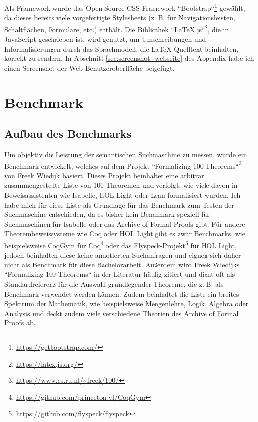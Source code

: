 \documentclass[12pt,letterpaper]{article} %
\begin{document}
Als Framework wurde das Open-Source-CSS-Framework ``Bootstrap``\footnote{\url{https://getbootstrap.com/}} gewählt, da dieses bereits viele vorgefertigte Stylesheets (z. B. für Navigationsleisten, Schaltflächen, Formulare, etc.) enthält.
Die Bibliothek ``LaTeX.js``\footnote{\url{https://latex.js.org/}}, die in JavaScript geschrieben ist, wird genutzt, um Umschreibungen und Informalisierungen durch das Sprachmodell, die LaTeX-Quelltext beinhalten, korrekt zu rendern.
In Abschnitt \ref{sec:screenshot_webseite} des Appendix habe ich einen Screenshot der Web-Benutzeroberfläche beigefügt.

\section{Benchmark}

\subsection{Aufbau des Benchmarks}
\label{sec:aufbau_des_benchmarks}

Um objektiv die Leistung der semantischen Suchmaschine zu messen, wurde ein Benchmark entwickelt, welches auf dem Projekt ``Formalizing 100 Theorems``\footnote{\url{https://www.cs.ru.nl/~freek/100/}} von Freek Wiedijk basiert.
Dieses Projekt beinhaltet eine arbiträr zusammengestellte Liste von 100 Theoremen und verfolgt, wie viele davon in Beweisassistenten wie Isabelle, HOL Light oder Lean formalisiert wurden.
Ich habe mich für diese Liste als Grundlage für das Benchmark zum Testen der Suchmaschine entschieden, da es bisher kein Benchmark speziell für Suchmaschinen für Isabelle oder das Archive of Formal Proofs gibt.
Für andere Theorembeweissysteme wie Coq oder HOL Light gibt es zwar Benchmarks, wie beispielsweise CoqGym für Coq\footnote{\url{https://github.com/princeton-vl/CoqGym}} oder das Flyspeck-Projekt\footnote{\url{https://github.com/flyspeck/flyspeck}} für HOL Light, jedoch beinhalten diese keine annotierten Suchanfragen und eignen sich daher nicht als Benchmark für diese Bachelorarbeit.
Außerdem wird Freek Wiedijks ``Formalizing 100 Theorems`` in der Literatur häufig zitiert \citep{koepke_formalizing_nodate, kornilowicz_all_2017} und dient oft als Standardreferenz für die Auswahl grundlegender Theoreme, die z. B. als Benchmark verwendet werden können.
Zudem beinhaltet die Liste ein breites Spektrum der Mathematik, wie beispielsweise Mengenlehre, Logik, Algebra oder Analysis und deckt zudem viele verschiedene Theorien des Archive of Formal Proofs ab.
\end{document}

